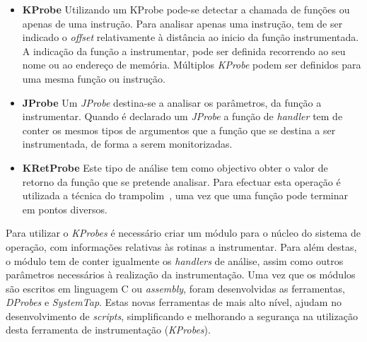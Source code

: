 \begin{itemize}
 \item \textbf{KProbe}
Utilizando um KProbe pode-se detectar a chamada de funções ou apenas de uma instrução.
Para analisar apenas uma instrução, tem de ser indicado o \textit{offset} relativamente à distância ao inicio da função instrumentada.
A indicação da função a instrumentar, pode ser definida recorrendo ao seu nome ou ao endereço de memória.
Múltiplos \textit{KProbe} podem ser definidos para uma mesma função ou instrução.

\item \textbf{JProbe}
Um \textit{JProbe} destina-se a analisar os parâmetros, da função a instrumentar.
Quando é declarado um \textit{JProbe} a função de \textit{handler} tem de conter os mesmos tipos de argumentos que a função que se destina a ser instrumentada, de forma a serem monitorizadas.
 

 \item \textbf{KRetProbe}
Este tipo de análise tem como objectivo obter o valor de retorno da função que se pretende analisar.
Para efectuar esta operação é utilizada a técnica do trampolim~\cite{Hollingsworth94dynamicprogram}, uma vez que uma função pode terminar em pontos diversos.


\end{itemize}

Para utilizar o \textit{KProbes} é necessário criar um módulo para o núcleo do sistema de operação, com informações relativas às rotinas a instrumentar.
Para além destas, o módulo tem de conter igualmente os \textit{handlers} de análise, assim como outros parâmetros necessários à realização da instrumentação.
Uma vez que os módulos são escritos em linguagem C ou \textit{assembly}, foram desenvolvidas as ferramentas, \textit{DProbes} e \textit{SystemTap}.
Estas novas ferramentas de mais alto nível, ajudam no desenvolvimento de \textit{scripts}, simplificando e melhorando a segurança na utilização desta ferramenta de instrumentação (\textit{KProbes}).

